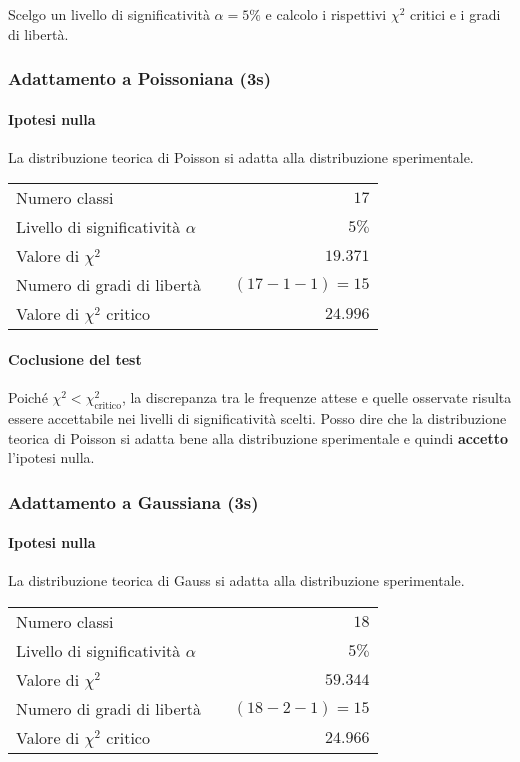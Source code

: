 \documentclass{article}
\begin{document}
Scelgo un livello di significatività $\alpha = 5\%$ e calcolo i rispettivi $\chi^2$ critici e i gradi di libertà.


\subsubsection{Adattamento a Poissoniana (3s)}
\paragraph{Ipotesi nulla} La distribuzione teorica di Poisson si adatta alla distribuzione sperimentale.

\vspace{0.2cm}
\begin{center}
\begin{tabular}{lr}
	Numero classi & $17$ \\
	Livello di significatività $\alpha$		& $ \quad 5\%$  \\
	Valore di $\chi ^2$             	& $\quad 19.371$       \\
	Numero di gradi di libertà      	& $\quad (17-1-1) = 15$         \\   
	Valore di $\chi ^2$ critico     	& $\quad 24.996$
\end{tabular}
\end{center}

\paragraph{Coclusione del test} Poiché $\chi^2 < \chi^2_{\text{critico}}$, la discrepanza tra le frequenze attese e quelle osservate risulta essere accettabile nei livelli di significatività scelti. Posso dire che la distribuzione teorica di Poisson si adatta bene alla distribuzione sperimentale e quindi \textbf{accetto} l'ipotesi nulla.


\subsubsection{Adattamento a Gaussiana (3s)}
\paragraph{Ipotesi nulla} La distribuzione teorica di Gauss si adatta alla distribuzione sperimentale.

\vspace{0.2cm}
\begin{center}
\begin{tabular}{lr}
	Numero classi & $18$ \\
	Livello di significatività $\alpha$		& $ \quad 5\%$  \\
	Valore di $\chi ^2$             	& $\quad 59.344$       \\
	Numero di gradi di libertà      	& $\quad (18-2-1) = 15$         \\   
	Valore di $\chi ^2$ critico     	& $\quad 24.966$
\end{tabular}
\end{center}
\end{document}
